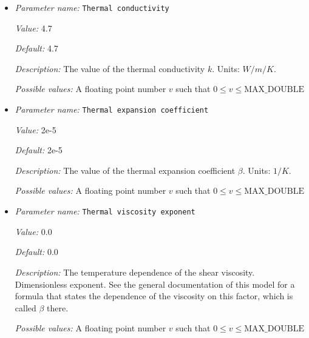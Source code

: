 \begin{itemize}
{\it Default:} 0.0


{\it Description:} The temperature dependence of the bulk viscosity. Dimensionless exponent. See the general documentation of this model for a formula that states the dependence of the viscosity on this factor, which is called $\beta$ there.


{\it Possible values:} A floating point number $v$ such that $0 \leq v \leq \text{MAX\_DOUBLE}$
\item {\it Parameter name:} {\tt Thermal conductivity}
\label{parameters:Material model/Melt global/Thermal conductivity}


{\it Value:} 4.7


{\it Default:} 4.7


{\it Description:} The value of the thermal conductivity $k$. Units: $W/m/K$.


{\it Possible values:} A floating point number $v$ such that $0 \leq v \leq \text{MAX\_DOUBLE}$
\item {\it Parameter name:} {\tt Thermal expansion coefficient}
\label{parameters:Material model/Melt global/Thermal expansion coefficient}


{\it Value:} 2e-5


{\it Default:} 2e-5


{\it Description:} The value of the thermal expansion coefficient $\beta$. Units: $1/K$.


{\it Possible values:} A floating point number $v$ such that $0 \leq v \leq \text{MAX\_DOUBLE}$
\item {\it Parameter name:} {\tt Thermal viscosity exponent}
\label{parameters:Material model/Melt global/Thermal viscosity exponent}


{\it Value:} 0.0


{\it Default:} 0.0


{\it Description:} The temperature dependence of the shear viscosity. Dimensionless exponent. See the general documentation of this model for a formula that states the dependence of the viscosity on this factor, which is called $\beta$ there.


{\it Possible values:} A floating point number $v$ such that $0 \leq v \leq \text{MAX\_DOUBLE}$
\end{itemize}

